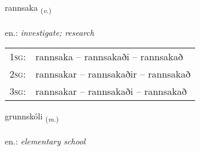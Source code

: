 \documentclass[frontgrid, backgrid]{flacards}\usepackage[]{graphicx}\usepackage[]{xcolor}
\begin{document}
\renewcommand{\flhead}{\vskip5pt \fboxsep=0pt {\small\bfseries\footnotesize Sagnorð | Verb}}
\renewcommand{\fcfoot}{\vskip5pt \fboxsep=0pt \hspace{2pt}{\small\bfseries\footnotesize 2K}}

\renewcommand{\blhead}{\vskip5pt {\small\bfseries\footnotesize Sagnorð | Verb }}
\renewcommand{\bcfoot}{\vskip5pt \hspace{2pt}{\small\bfseries\footnotesize 2K}}


{rannsaka \small{\textsubscript{(\textit{v.})}} \\[1ex] %
\textphonetic{[ransaka]} \\
en.: \emph{investigate; research} \\  [2ex]
\renewcommand*{\arraystretch}{0.8}
\begin{tabular}{p{1cm}l}
\textsc{1sg}: & rannsaka -- rannsakaði -- rannsakað \\ 
\textsc{2sg}: & rannsakar -- rannsakaðir -- rannsakað \\ 
\textsc{3sg}: & rannsakar -- rannsakaði -- rannsakað \\ 
\end{tabular}
}

\renewcommand{\flhead}{\vskip5pt \fboxsep=0pt {\small\bfseries\footnotesize Nafnorð | Noun}}
\renewcommand{\fcfoot}{\vskip5pt \fboxsep=0pt \hspace{2pt}{\small\bfseries\footnotesize 2K}}

\renewcommand{\blhead}{\vskip5pt {\small\bfseries\footnotesize Nafnorð | Noun }}
\renewcommand{\bcfoot}{\vskip5pt \hspace{2pt}{\small\bfseries\footnotesize 2K}}


{grunnskóli \small{\textsubscript{(\textit{m.})}} \\[1ex] %
\textphonetic{[krʏnskoulɪ]} \\
en.: \emph{elementary school} \\  [2ex]
\renewcommand*{\arraystretch}{0.8}
}
\end{document}
